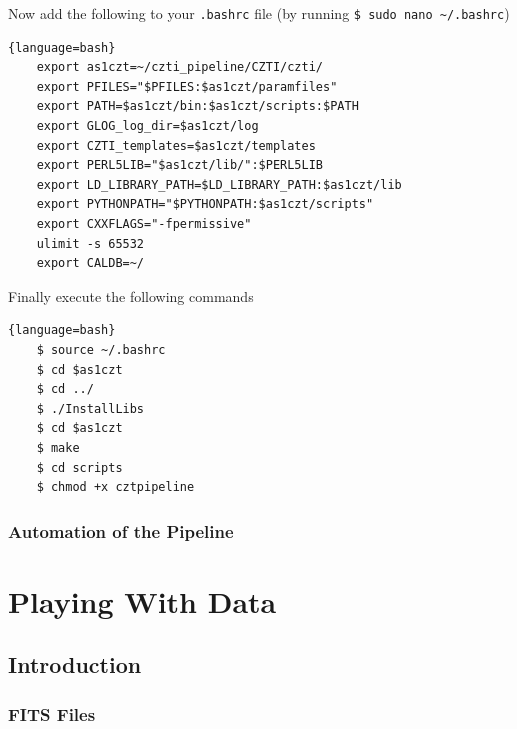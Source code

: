 \documentclass[11pt]{book} %
\begin{document}
Now add the following to your \lstinline[language=bash]{.bashrc} file (by running \lstinline[language=bash]{$ sudo nano ~/.bashrc})
\begin{lstlisting}{language=bash}
    export as1czt=~/czti_pipeline/CZTI/czti/
    export PFILES="$PFILES:$as1czt/paramfiles"
    export PATH=$as1czt/bin:$as1czt/scripts:$PATH
    export GLOG_log_dir=$as1czt/log
    export CZTI_templates=$as1czt/templates
    export PERL5LIB="$as1czt/lib/":$PERL5LIB
    export LD_LIBRARY_PATH=$LD_LIBRARY_PATH:$as1czt/lib
    export PYTHONPATH="$PYTHONPATH:$as1czt/scripts"
    export CXXFLAGS="-fpermissive"
    ulimit -s 65532
    export CALDB=~/
\end{lstlisting}


Finally execute the following commands

\begin{lstlisting}{language=bash}
    $ source ~/.bashrc
    $ cd $as1czt
    $ cd ../
    $ ./InstallLibs
    $ cd $as1czt
    $ make
    $ cd scripts
    $ chmod +x cztpipeline
\end{lstlisting}

\subsection{Automation of the Pipeline}


\chapter{Playing With Data}

\section{Introduction}

\subsection{FITS Files}
\end{document}
